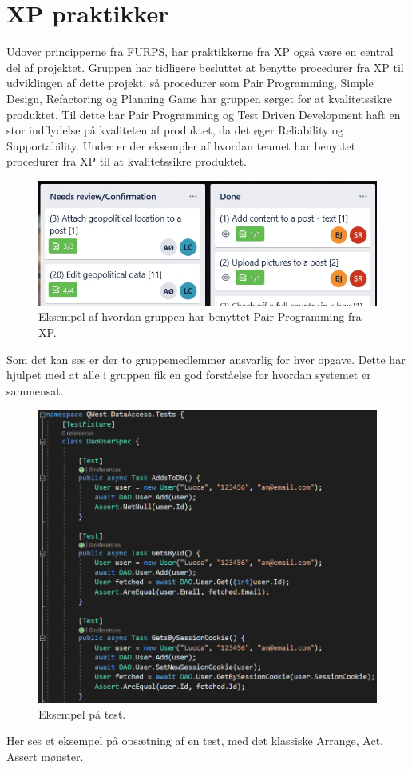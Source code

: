 \section{XP praktikker}
Udover principperne fra FURPS, har praktikkerne fra XP også være en central del af projektet. Gruppen har tidligere besluttet at benytte procedurer fra XP til udviklingen af dette projekt, så procedurer som Pair Programming, Simple Design, Refactoring og Planning Game har gruppen sørget for at kvalitetssikre produktet. Til dette har Pair Programming og Test Driven Development\cite{Sommerville} haft en stor indflydelse på kvaliteten af produktet, da det øger Reliability og Supportability.
Under er der eksempler af hvordan teamet har benyttet procedurer fra XP til at kvalitetssikre produktet. 

\begin{figure}
    \includegraphics[width=\linewidth]{figures/pairprogramming.jpg}
    \caption{Eksempel af hvordan gruppen har benyttet Pair Programming fra XP.}
    \label{fig:Pair}
\end{figure}
Som det kan ses er der to gruppemedlemmer ansvarlig for hver opgave. Dette har hjulpet med at alle i gruppen fik en god forståelse for hvordan systemet er sammensat.


\begin{figure}
    \includegraphics[width=\linewidth]{figures/tests2.png}
    \caption{Eksempel på test.}
    \label{fig:Test}
\end{figure}
Her ses et eksempel på opsætning af en test, med det klassiske Arrange, Act, Assert mønster. 

